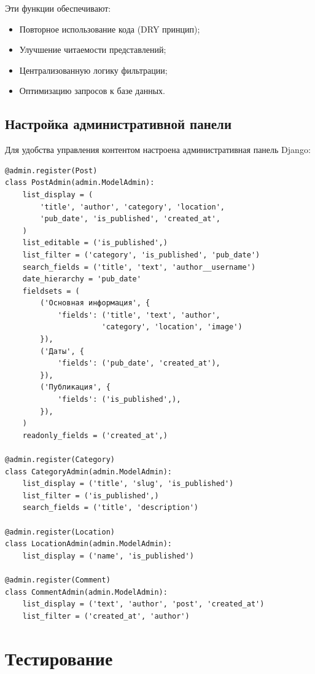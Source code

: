 \documentclass[pract,och,bachelor]{SCWorks}
\begin{document}
Эти функции обеспечивают:
\begin{itemize}
    \item Повторное использование кода (DRY принцип);
    \item Улучшение читаемости представлений;
    \item Централизованную логику фильтрации;
    \item Оптимизацию запросов к базе данных.
\end{itemize}

\subsection{Настройка административной панели}

Для удобства управления контентом настроена административная панель Django:

\begin{listing}[H]
\begin{verbatim}
@admin.register(Post)
class PostAdmin(admin.ModelAdmin):
    list_display = (
        'title', 'author', 'category', 'location',
        'pub_date', 'is_published', 'created_at',
    )
    list_editable = ('is_published',)
    list_filter = ('category', 'is_published', 'pub_date')
    search_fields = ('title', 'text', 'author__username')
    date_hierarchy = 'pub_date'
    fieldsets = (
        ('Основная информация', {
            'fields': ('title', 'text', 'author', 
                      'category', 'location', 'image')
        }),
        ('Даты', {
            'fields': ('pub_date', 'created_at'),
        }),
        ('Публикация', {
            'fields': ('is_published',),
        }),
    )
    readonly_fields = ('created_at',)

@admin.register(Category)
class CategoryAdmin(admin.ModelAdmin):
    list_display = ('title', 'slug', 'is_published')
    list_filter = ('is_published',)
    search_fields = ('title', 'description')

@admin.register(Location)
class LocationAdmin(admin.ModelAdmin):
    list_display = ('name', 'is_published')

@admin.register(Comment)
class CommentAdmin(admin.ModelAdmin):
    list_display = ('text', 'author', 'post', 'created_at')
    list_filter = ('created_at', 'author')
\end{verbatim}
\caption{Настройки административной панели}
\end{listing}

\section{Тестирование}
\end{document}
